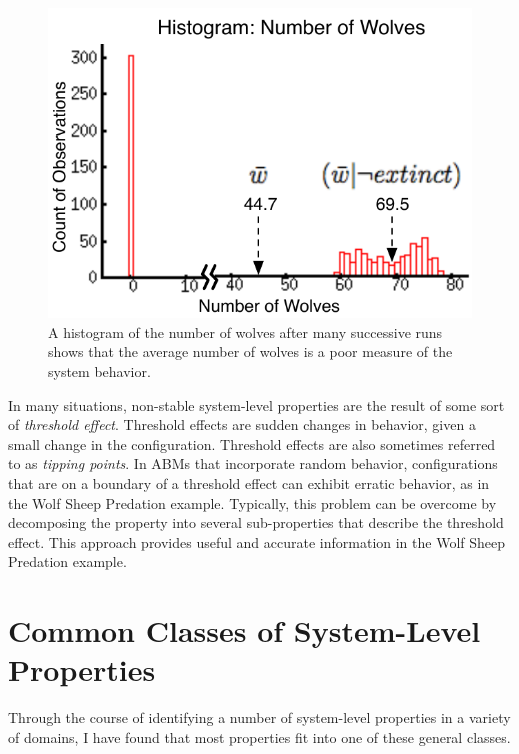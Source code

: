 \begin{figure}[ht]
\centering
\includegraphics{images/num_wolves.pdf}
\caption{A histogram of the number of wolves after many successive runs shows that the average number of wolves is a poor measure of the system behavior.}
\label{fig:num_wolves}
\end{figure}


In many situations, non-stable system-level properties are the result of some sort of \textit{threshold effect}.
Threshold effects are sudden changes in behavior, given a small change in the configuration.
Threshold effects are also sometimes referred to as \textit{tipping points}.
In ABMs that incorporate random behavior, configurations that are on a boundary of a threshold effect can exhibit erratic behavior, as in the Wolf Sheep Predation example.
Typically, this problem can be overcome by decomposing the property into several sub-properties that describe the threshold effect. 
This approach provides useful and accurate information in the Wolf Sheep Predation example.

\section{Common Classes of System-Level Properties}

Through the course of identifying a number of system-level properties in a variety of domains, I have found that most properties fit into one of these general classes.



